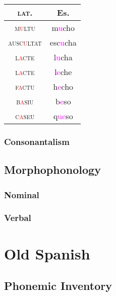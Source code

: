 \documentclass{report}
\begin{document}
\begin{tcolorbox}[title=Raising]
  
\end{tcolorbox}

\begin{tabular}{c c}
  \textsc{lat.} & Es. \\
  \hline
  \textsc{m\textcolor{red}{u}ltu} & m\textcolor{magenta}{u}cho \\
  \textsc{ausc\textcolor{red}{u}ltat} & esc\textcolor{magenta}{u}cha \\
  \textsc{l\textcolor{red}{a}cte} & l\textcolor{magenta}{u}cha \\
  \textsc{l\textcolor{red}{a}cte} & l\textcolor{magenta}{e}che \\
  \textsc{f\textcolor{red}{a}ctu} & h\textcolor{magenta}{e}cho \\
  \textsc{b\textcolor{red}{a}siu} & b\textcolor{magenta}{e}so \\
  \textsc{c\textcolor{red}{a}seu} & q\textcolor{magenta}{ue}so \\
\end{tabular}

\subsection{Consonantalism}

\section{Morphophonology}

\subsection{Nominal}

\subsection{Verbal}

\chapter{Old Spanish}


\section{Phonemic Inventory}
\end{document}
